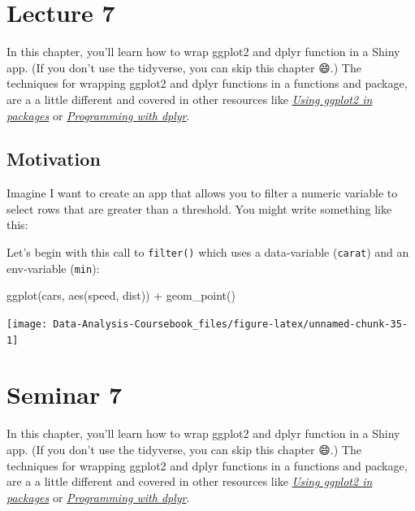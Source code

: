 \documentclass[
]{article}
\newenvironment{Shaded}{\begin{snugshade}}{\end{snugshade}}
\newcommand{\FunctionTok}[1]{\textcolor[rgb]{0.00,0.00,0.00}{#1}}
\newcommand{\NormalTok}[1]{#1}
\newcommand{\SpecialCharTok}[1]{\textcolor[rgb]{0.00,0.00,0.00}{#1}}
\begin{document}
\hypertarget{lecture7}{%
\section{Lecture 7}\label{lecture7}}

In this chapter, you'll learn how to wrap ggplot2 and dplyr function in a Shiny app.
(If you don't use the tidyverse, you can skip this chapter 😄.) The techniques for wrapping ggplot2 and dplyr functions in a functions and package, are a a little different and covered in other resources like \href{http://ggplot2.tidyverse.org/dev/articles/ggplot2-in-packages.html}{\emph{Using ggplot2 in packages}} or \href{http://dplyr.tidyverse.org/articles/programming.html}{\emph{Programming with dplyr}}.

\hypertarget{tidy-motivation}{%
\subsection{Motivation}\label{tidy-motivation}}

Imagine I want to create an app that allows you to filter a numeric variable to select rows that are greater than a threshold.
You might write something like this:

Let's begin with this call to \texttt{filter()} which uses a data-variable (\texttt{carat}) and an env-variable (\texttt{min}):

\begin{Shaded}
\begin{Highlighting}[]
\FunctionTok{ggplot}\NormalTok{(cars, }\FunctionTok{aes}\NormalTok{(speed, dist)) }\SpecialCharTok{+} 
  \FunctionTok{geom\_point}\NormalTok{()}
\end{Highlighting}
\end{Shaded}

\begin{center}\texttt{[image: Data-Analysis-Coursebook\_files/figure-latex/unnamed-chunk-35-1]} \end{center}

\hypertarget{seminar7}{%
\section{Seminar 7}\label{seminar7}}

In this chapter, you'll learn how to wrap ggplot2 and dplyr function in a Shiny app.
(If you don't use the tidyverse, you can skip this chapter 😄.) The techniques for wrapping ggplot2 and dplyr functions in a functions and package, are a a little different and covered in other resources like \href{http://ggplot2.tidyverse.org/dev/articles/ggplot2-in-packages.html}{\emph{Using ggplot2 in packages}} or \href{http://dplyr.tidyverse.org/articles/programming.html}{\emph{Programming with dplyr}}.
\end{document}
